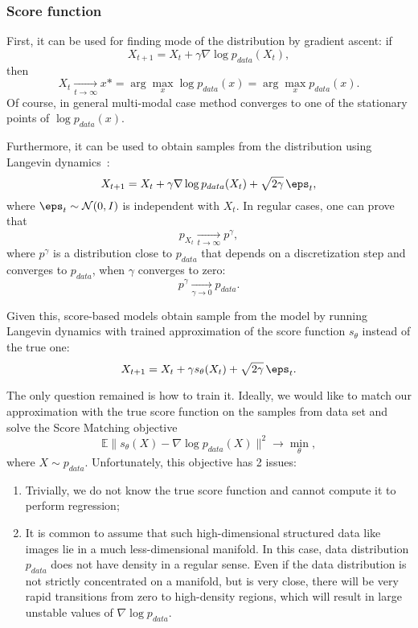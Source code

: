 \subsubsection{Score function} \label{sec:score}
First, it can be used for finding mode of the distribution by gradient ascent: if 
\[
    X_{t + 1} = X_t + \gamma \nabla \log p_{data}(X_t),
\]
then
\[
    X_t \xrightarrow[t \rightarrow \infty]{} x* = \arg\max\limits_{x} \log p_{data}(x) = \arg\max\limits_{x} p_{data}(x).
\]
Of course, in general multi-modal case method converges to one of the stationary points of $\log p_{data}(x)$.

Furthermore, it can be used to obtain samples from the distribution using Langevin dynamics~\cite{welling2011bayesian}:
\begin{equation}\label{eq:langevin_dynamics}
    X_{t + 1} = X_t + \gamma \nabla \log p_{data}(X_t) + \sqrt{2 \gamma} \, \eps_t,    
\end{equation}
where $\eps_t \sim \mathcal{N}(0, I)$ is independent with $X_t$. In regular cases, one can prove that 
\[
    p_{X_t} \xrightarrow[t \rightarrow \infty]{} p^{\gamma},
\]
where $p^{\gamma}$ is a distribution close to $p_{data}$ that depends on a discretization step and converges to $p_{data}$, when $\gamma$ converges to zero:
\[
    p^{\gamma} \xrightarrow[\gamma \rightarrow 0]{} p_{data}.
\]

Given this, score-based models obtain sample from the model by running Langevin dynamics with trained approximation of the score function $s_\theta$ instead of the true one:
\[
    X_{t + 1} = X_t + \gamma s_\theta(X_t) + \sqrt{2\gamma}\, \eps_t.
\]

The only question remained is how to train it. Ideally, we would like to match our approximation with the true score function on the samples from data set and solve the Score Matching objective
\begin{equation}\label{eq:score_matching}
\mathbb{E} \| s_\theta(X) - \nabla \log p_{data}(X)\|^2 \rightarrow \min\limits_{\theta},
\end{equation}
where $X \sim p_{data}$. Unfortunately, this objective has 2 issues:
\begin{enumerate}
    \item Trivially, we do not know the true score function and cannot compute it to perform regression;
    \item It is common to assume that such high-dimensional structured data like images lie in a much less-dimensional manifold. In this case, data distribution $p_{data}$ does not have density in a regular sense. Even if the data distribution is not strictly concentrated on a manifold, but is very close, there will be very rapid transitions from zero to high-density regions, which will result in large unstable values of $\nabla \log p_{data}$.
\end{enumerate}

